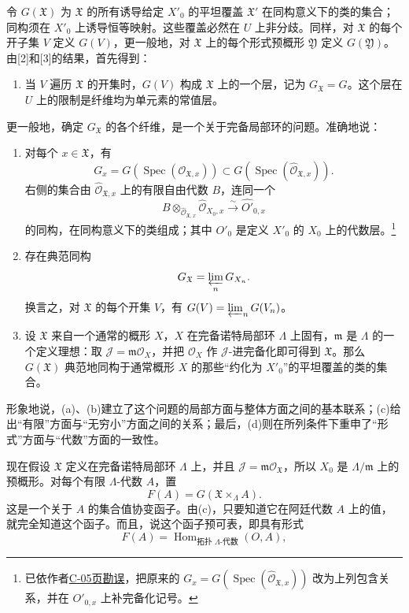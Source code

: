 令 $G(\mathfrak X)$ 为 $\mathfrak X$ 的所有诱导给定 $X'_0$ 的平坦覆盖 $\mathfrak X'$ 在同构意义下的类的集合；同构须在 $X'_0$ 上诱导恒等映射。这些覆盖必然在 $U$ 上非分歧。同样，对 $\mathfrak X$ 的每个开子集 $V$ 定义 $G(V)$，更一般地，对 $\mathfrak X$ 上的每个形式预概形 $\mathfrak Y$ 定义 $G(\mathfrak Y)$。由[2]和[3]的结果，首先得到：
\begin{enumerate}
\item[(a)] 当 $V$ 遍历 $\mathfrak X$ 的开集时，$G(V)$ 构成 $\mathfrak X$ 上的一个层，记为 $G_{\mathfrak X}=G$。这个层在 $U$ 上的限制是纤维均为单元素的常值层。
\end{enumerate}
更一般地，确定 $G_{\mathfrak X}$ 的各个纤维，是一个关于完备局部环的问题。准确地说：
\begin{enumerate}
\item[(b)] 对每个 $x\in\mathfrak X$，有
\[
 G_x=G(\operatorname{Spec}(\mathcal O_{\mathfrak X,x}))
 \subset G(\operatorname{Spec}(\widehat{\mathcal O}_{\mathfrak X,x})).
\]
右侧的集合由 $\widehat{\mathcal O}_{\mathfrak X,x}$ 上的有限自由代数 $B$，连同一个
\[
 B\otimes_{\widehat{\mathcal O}_{\mathfrak X,x}}
 \widehat{\mathcal O}_{X_0,x}\xrightarrow{\sim}\widehat{O'}_{0,x}
\]
的同构，在同构意义下的类组成；其中 $O'_0$ 是定义 $X'_0$ 的 $X_0$ 上的代数层。\footnote{已依作者\hyperref[orig:7]{C-05页勘误}，把原来的 $G_x=G(\operatorname{Spec}(\widehat{\mathcal O}_{\mathfrak X,x}))$ 改为上列包含关系，并在 $O'_{0,x}$ 上补完备化记号。}
\item[(c)] 存在典范同构
\[
 G_{\mathfrak X}=\varprojlim_nG_{X_n}.
\]
换言之，对 $\mathfrak X$ 的每个开集 $V$，有 $G(V)=\varprojlim_nG(V_n)$。
\item[(d)] 设 $\mathfrak X$ 来自一个通常的概形 $X$，$X$ 在完备诺特局部环 $\Lambda$ 上固有，$\mathfrak m$ 是 $\Lambda$ 的一个定义理想：取 $\mathcal J=\mathfrak m\mathcal O_X$，并把 $\mathcal O_X$ 作 $\mathcal J$-进完备化即可得到 $\mathfrak X$。那么 $G(\mathfrak X)$ 典范地同构于通常概形 $X$ 的那些“约化为 $X'_0$”的平坦覆盖的类的集合。
\end{enumerate}
形象地说，(a)、(b)建立了这个问题的局部方面与整体方面之间的基本联系；(c)给出“有限”方面与“无穷小”方面之间的关系；最后，(d)则在所列条件下重申了“形式”方面与“代数”方面的一致性。

现在假设 $\mathfrak X$ 定义在完备诺特局部环 $\Lambda$ 上，并且 $\mathcal J=\mathfrak m\mathcal O_{\mathfrak X}$，所以 $X_0$ 是 $\Lambda/\mathfrak m$ 上的预概形。对每个有限 $\Lambda$-代数 $A$，置
\[
 F(A)=G(\mathfrak X\times_{\Lambda}A).
\]
这是一个关于 $A$ 的集合值协变函子。由(c)，只要知道它在阿廷代数 $A$ 上的值，就完全知道这个函子。而且，说这个函子预可表，即具有形式
\[
 F(A)=\operatorname{Hom}_{\text{拓扑 $\Lambda$-代数}}(O,A),
\]

